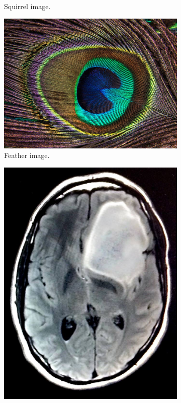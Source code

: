 \documentclass[abstracton]{scrreprt}
\begin{document}
\begin{figure}[!ht]
\begin{subfigure}[b]{0.22\textwidth}
                    \caption{Squirrel image.}
                \end{subfigure}
                \begin{subfigure}[b]{0.245\textwidth}
                    \includegraphics[width=\textwidth]{img/images/peacock-feather.png}
                    \caption{Feather image.}
                \end{subfigure}
                \begin{subfigure}[b]{0.25\textwidth}
                    \includegraphics[width=\textwidth]{img/images/keating.jpg}

\end{subfigure}
\end{figure}
\end{document}
